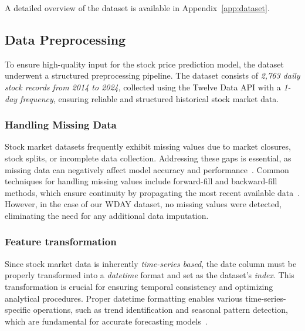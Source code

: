 A detailed overview of the dataset is available in Appendix~\ref{app:dataset}.

\subsection{Data Preprocessing}

To ensure high-quality input for the stock price prediction model, the dataset
underwent a structured preprocessing pipeline. The dataset consists of 
\emph{2,763 daily stock records from 2014 to 2024}, collected using the 
Twelve Data API with a \emph{1-day frequency}, ensuring reliable and structured
historical stock market data.

\subsubsection{Handling Missing Data}

Stock market datasets frequently exhibit missing values due to market closures, stock 
splits, or incomplete data collection. Addressing these gaps is essential, as missing data 
can negatively affect model accuracy and performance~\parencite{shaban2024SMPDL}. Common 
techniques for handling missing values include forward-fill and backward-fill methods, 
which ensure continuity by propagating the most recent available 
data~\parencite{shaban2024SMPDL}. However, in the case of our WDAY dataset, no missing 
values were detected, eliminating the need for any additional data imputation.

\subsubsection{Feature transformation}

Since stock market data is inherently \emph{time-series based}, the date column must be properly transformed 
into a \emph{datetime} format and set as the dataset's \emph{index}. This transformation is crucial for 
ensuring temporal consistency and optimizing analytical procedures. Proper datetime formatting enables 
various time-series-specific operations, such as trend identification and seasonal pattern detection, which 
are fundamental for accurate forecasting models~\parencite{chang2024StockPrediction}.

